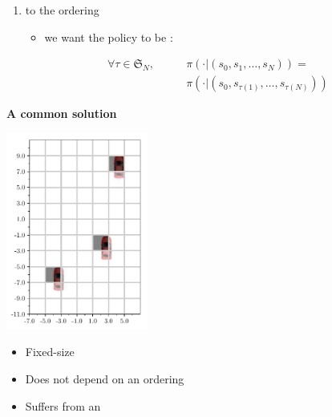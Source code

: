 \documentclass[paperwidth=36in,paperheight=48in,portrait,fontscale=0.3, margin=2cm]{baposter}
\begin{document}
\begin{poster}
{\begin{enumerate}
	\item {} to the ordering
	\begin{itemize}
		\item[\incarrow] we want the policy to be :
	\end{itemize}
\begin{align*}
\forall\tau \in \mathfrak{S}_N, \qquad &\pi(\cdot|(s_0, s_1,\dotsc,s_N)) = \\ &\pi(\cdot|(s_0, s_{\tau(1)},\dotsc,s_{\tau(N)}))
\end{align*}
\end{enumerate}

\textbf{A common solution}
\begin{center}
	\includegraphics[width=0.35\textwidth]{../img/map}
\end{center}

\begin{itemize}[]
	\item[\hlg{\checkmark}] Fixed-size
	\item[\hlg{\checkmark}] Does not depend on an ordering
	\item[\hlr{\xmark}] Suffers from an 
\end{itemize}

}


\end{poster}
\end{document}
